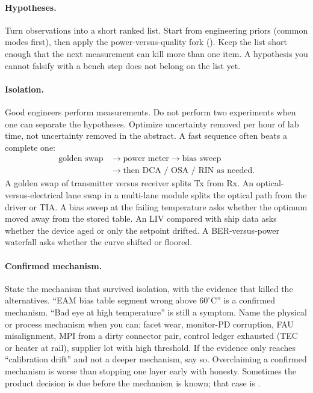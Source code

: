 \paragraph{Hypotheses.}
Turn observations into a short ranked list. Start from engineering priors
(common modes first), then apply the power-versus-quality fork
(). Keep the list short enough that the next
measurement can kill more than one item. A hypothesis you cannot falsify with
a bench step does not belong on the list yet.

\paragraph{Isolation.}
Good engineers perform measurements. Do not perform two experiments when one
can separate the hypotheses.
Optimize uncertainty removed per hour of lab time, not uncertainty removed
in the abstract. A fast sequence often beats a complete one:
\[
\begin{split}
\text{golden swap} &\longrightarrow \text{power meter}
\longrightarrow \text{bias sweep}\\
&\longrightarrow \text{then DCA / OSA / RIN as needed}.
\end{split}
\]
A golden swap of transmitter versus receiver splits Tx from Rx. An
optical-versus-electrical lane swap in a multi-lane module splits the optical
path from the driver or TIA. A bias sweep at the failing
temperature asks whether the optimum moved away from the stored table. An
LIV compared with ship data asks whether the device aged or only
the setpoint drifted. A BER-versus-power waterfall asks whether the curve
shifted or floored.

\paragraph{Confirmed mechanism.}
State the mechanism that survived isolation, with the evidence that killed
the alternatives. ``EAM bias table segment wrong above
$60^\circ$C'' is a confirmed mechanism. ``Bad eye at high temperature'' is still a
symptom. Name the physical or process mechanism when you can: facet wear,
monitor-PD corruption, FAU misalignment, MPI
from a dirty connector pair, control ledger exhausted (TEC or
heater at rail), supplier lot with high threshold. If the evidence only
reaches ``calibration drift'' and not a deeper mechanism, say so.
Overclaiming a confirmed mechanism is worse than stopping one layer early with
honesty. Sometimes the product decision is due before the mechanism is known;
that case is .

